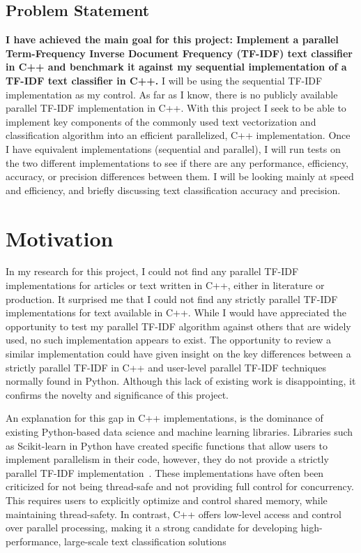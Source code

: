 \documentclass[conference]{IEEEtran}
\begin{document}
\subsection{Problem Statement}
\textbf{I have achieved the main goal for this project: Implement a parallel Term-Frequency Inverse Document Frequency (TF-IDF) text classifier in C++ and benchmark it against my sequential implementation of a TF-IDF text classifier in C++.}
I will be using the sequential TF-IDF implementation as my control. As far as I know, there is no publicly available parallel TF-IDF implementation in C++. With this project I seek to be able to implement key components of the commonly used text vectorization and classification algorithm into an efficient parallelized, C++ implementation. Once I have equivalent implementations (sequential and parallel), I will run tests on the two different implementations to see if there are any performance, efficiency, accuracy, or precision differences between them. I will be looking mainly at speed and efficiency, and briefly discussing text classification accuracy and precision.

\section{Motivation}
In my research for this project, I could not find any parallel TF-IDF implementations for articles or text written in C++, either in literature or production. It surprised me that I could not find any strictly parallel TF-IDF implementations for text available in C++. While I would have appreciated the opportunity to test my parallel TF-IDF algorithm against others that are widely used, no such implementation appears to exist. The opportunity to review a similar implementation could have given insight on the key differences between a strictly parallel TF-IDF in C++ and user-level parallel TF-IDF techniques normally found in Python. Although this lack of existing work is disappointing, it confirms the novelty and significance of this project.

An explanation for this gap in C++ implementations, is the dominance of existing Python-based data science and machine learning libraries. Libraries such as Scikit-learn in Python have created specific functions that allow users to implement parallelism in their code, however, they do not provide a strictly parallel TF-IDF implementation~\cite{b4}. These implementations have often been criticized for not being thread-safe and not providing full control for concurrency. This requires users to explicitly optimize and control shared memory, while maintaining thread-safety. In contrast, C++ offers low-level access and control over parallel processing, making it a strong candidate for developing high-performance, large-scale text classification solutions
\end{document}
